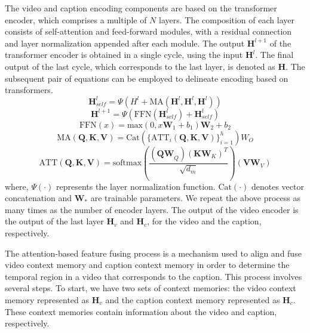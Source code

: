 The video and caption encoding components are based on the transformer encoder, which comprises a multiple of $N$ layers.
The composition of each layer consists of self-attention and feed-forward modules, with a residual connection and layer normalization appended after each module.
The output $\bm{H}^{l+1}$ of the transformer encoder is obtained in a single cycle, using the input $\bm{H}^l$.
The final output of the last cycle, which corresponds to the last layer, is denoted as $\bm{H}$.
The subsequent pair of equations can be employed to delineate encoding based on transformers.
\begin{equation}
    \bm{H}^{l}_{self} = \Psi \left(H^l + \text{MA}\left( \bm{H}^l, \bm{H}^l, \bm{H}^l \right) \right)
    \label{eq:video_encoder_self_attention}
\end{equation}
\begin{equation}
    \bm{H}^{l+1} = \Psi \left( \text{FFN}\left(\bm{H}^{l}_{self}\right) + \bm{H}^{l}_{self} \right)
    \label{eq:video_encoder_ffn}
\end{equation}
\begin{equation}
    \text{FFN}(x) = \text{max} \left(0, x\bm{W}_1 + b_1 \right)\bm{W}_2 + b_2
    \label{eq:video_encoder_feed_forward}
\end{equation}
\begin{equation}
    \text{MA}(\bm{Q}, \bm{K}, \bm{V}) = \text{Cat}(\{\text{ATT}_i(\bm{Q}, \bm{K}, \bm{V})\}_{i=1}^h)W_O
\end{equation}
\begin{equation}
    \text{ATT}(\bm{Q}, \bm{K}, \bm{V}) = \text{softmax}( \frac{(\bm{QW}_Q)(\bm{K}\bm{W}_K)^T}{\sqrt{d_m}} ) (\bm{VW}_V)
    \label{eq:video_encoder_att}
\end{equation}
where, $\Psi\left(\cdot\right)$ represents the layer normalization function.
$\text{Cat}(\cdot)$ denotes vector concatenation and $\bm{W}_*$ are trainable parameters.
We repeat the above process as many times as the number of encoder layers.
The output of the video encoder is the output of the last layer $\bm{H}_v$ and $\bm{H}_c$, for the video and the caption, respectively.

The attention-based feature fusing process is a mechanism used to align and fuse video context memory and caption context memory in order to determine the temporal region in a video that corresponds to the caption.
This process involves several steps.
To start, we have two sets of context memories: the video context memory represented as $\bm{H}_v$ and the caption context memory represented as $\bm{H}_c$.
These context memories contain information about the video and caption, respectively.

